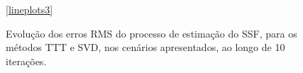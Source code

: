 \begin{figure}
    \ref*{lineplots3}
    \caption{Evolução dos erros RMS do processo de estimação do SSF, para os métodos TTT e SVD, nos cenários apresentados, ao longo de 10 iterações.}
    \label{fig:sec7:tt_ssf_rms_errors}
\end{figure}